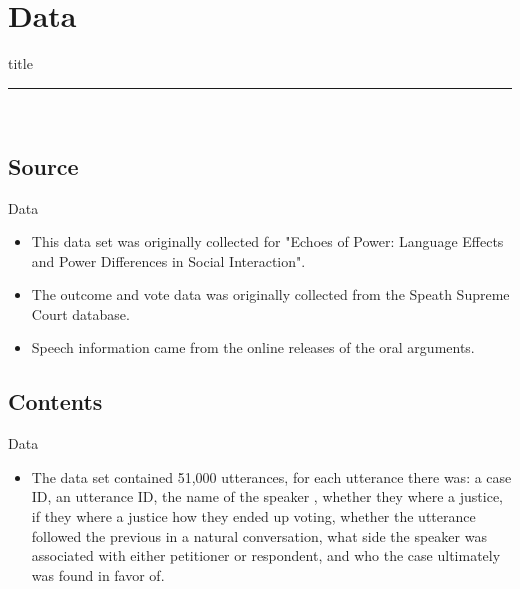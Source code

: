 \documentclass{beamer}
\begin{document}
\section{Data}
    \begin{frame}[plain]
        \vfill
      \centering
      \begin{beamercolorbox}[sep=8pt,center,shadow=true,rounded=true]{title}
        \insertsectionhead\par%
        \color{oxfordblue}\noindent\rule{10cm}{1pt} \\
      \end{beamercolorbox}
      \vfill
  \end{frame}
  
\subsection{Source}
\begin{frame}{Data}
\begin{itemize}
    \item This data set was originally collected for "Echoes of Power: Language Effects and Power Differences in Social Interaction". \cite{danescu-niculescu-mizil_echoes_2012}
    \item The outcome and vote data was originally collected from the Speath Supreme Court database.
    \cite{noauthor_supreme_nodate}
    \item Speech information came from the online releases of the oral arguments.
    \cite{noauthor_oral_nodate}

\end{itemize}
\end{frame}

\subsection{Contents}
\begin{frame}{Data}
\begin{itemize}
 \item The data set contained 51,000 utterances, for each utterance there was: a case ID, an utterance ID, the name of the speaker , whether they where a justice, if they where a justice how they ended up voting, whether the utterance followed the previous in a natural conversation, what side the speaker was associated with either petitioner or  respondent, and who the case ultimately was found in favor of. 
\end{itemize}
\end{frame}
\end{document}
